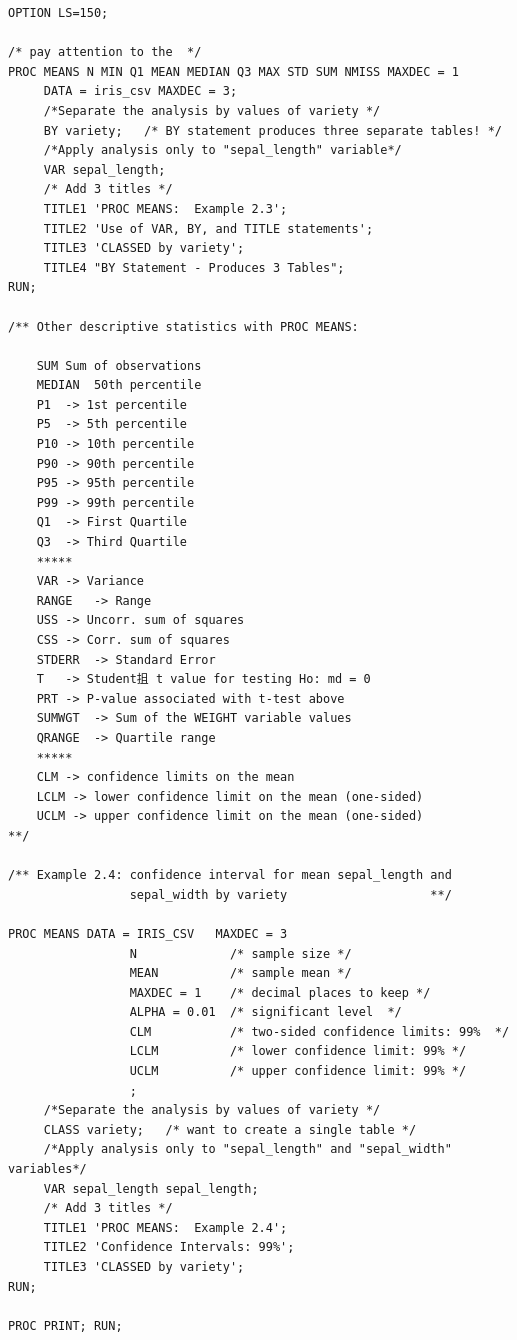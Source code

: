 \documentclass[
]{book}
\begin{document}
\begin{verbatim}
OPTION LS=150;

/* pay attention to the  */
PROC MEANS N MIN Q1 MEAN MEDIAN Q3 MAX STD SUM NMISS MAXDEC = 1 
     DATA = iris_csv MAXDEC = 3; 
     /*Separate the analysis by values of variety */
     BY variety;   /* BY statement produces three separate tables! */
     /*Apply analysis only to "sepal_length" variable*/
     VAR sepal_length;    
     /* Add 3 titles */
     TITLE1 'PROC MEANS:  Example 2.3';
     TITLE2 'Use of VAR, BY, and TITLE statements';
     TITLE3 'CLASSED by variety';
     TITLE4 "BY Statement - Produces 3 Tables";
RUN;        

/** Other descriptive statistics with PROC MEANS:

    SUM Sum of observations
    MEDIAN  50th percentile
    P1  -> 1st percentile
    P5  -> 5th percentile
    P10 -> 10th percentile
    P90 -> 90th percentile
    P95 -> 95th percentile
    P99 -> 99th percentile
    Q1  -> First Quartile
    Q3  -> Third Quartile
    *****
    VAR -> Variance
    RANGE   -> Range
    USS -> Uncorr. sum of squares
    CSS -> Corr. sum of squares
    STDERR  -> Standard Error
    T   -> Student抯 t value for testing Ho: md = 0
    PRT -> P-value associated with t-test above
    SUMWGT  -> Sum of the WEIGHT variable values
    QRANGE  -> Quartile range
    *****
    CLM -> confidence limits on the mean
    LCLM -> lower confidence limit on the mean (one-sided)
    UCLM -> upper confidence limit on the mean (one-sided)
**/

/** Example 2.4: confidence interval for mean sepal_length and 
                 sepal_width by variety                    **/

PROC MEANS DATA = IRIS_CSV   MAXDEC = 3
                 N             /* sample size */
                 MEAN          /* sample mean */
                 MAXDEC = 1    /* decimal places to keep */
                 ALPHA = 0.01  /* significant level  */
                 CLM           /* two-sided confidence limits: 99%  */
                 LCLM          /* lower confidence limit: 99% */
                 UCLM          /* upper confidence limit: 99% */
                 ; 
     /*Separate the analysis by values of variety */
     CLASS variety;   /* want to create a single table */
     /*Apply analysis only to "sepal_length" and "sepal_width" variables*/
     VAR sepal_length sepal_length; 
     /* Add 3 titles */
     TITLE1 'PROC MEANS:  Example 2.4';
     TITLE2 'Confidence Intervals: 99%';
     TITLE3 'CLASSED by variety';
RUN;        

PROC PRINT; RUN;



\end{verbatim}
\end{document}
